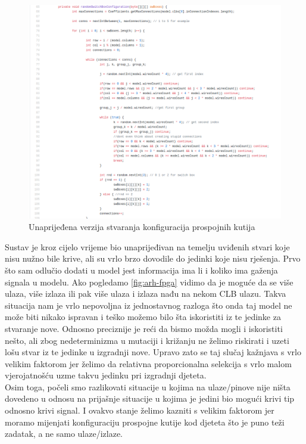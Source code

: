 \documentclass[times, utf8, zavrsni]{fer}
\begin{document}
\begin{figure}[!htb]
	\centering
	\includegraphics[width=18cm]{slike/noviRandomizer.png}
	\caption{Unaprijeđena verzija stvaranja konfiguracija prospojnih kutija}
	\label{fig:novi-random}
\end{figure} 



Sustav je kroz cijelo vrijeme bio unaprijeđivan na temelju uviđenih stvari koje nisu nužno bile krive, ali su vrlo brzo dovodile do jedinki koje nisu rješenja. Prvo što sam odlučio dodati u model jest informacija ima li i koliko ima gaženja signala u modelu. Ako pogledamo \ref{fig:arh-fpga} vidimo da je moguće da se više ulaza, više izlaza ili pak više ulaza i izlaza nađu na nekom CLB ulazu. Takva situacija nam je vrlo nepovoljna iz jednostavnog razloga što onda taj model ne može biti nikako ispravan i teško možemo bilo šta iskoristiti iz te jedinke za stvaranje nove. Odnosno preciznije je reći da bismo možda mogli i iskoristiti nešto, ali zbog nedeterminizma u mutaciji i križanju ne želimo riskirati i uzeti lošu stvar iz te jedinke u izgradnji nove. Upravo zato se taj slučaj kažnjava s vrlo velikim faktorom jer želimo da relativna proporcionalna selekcija s vrlo malom vjerojatnošću uzme takvu jedinku pri izgradnji djeteta. \\ 
Osim toga, počeli smo razlikovati situacije u kojima na ulaze/pinove nije ništa dovedeno u odnosu na prijašnje situacije u kojima je jedini bio mogući krivi tip odnosno krivi signal. I ovakvo stanje želimo kazniti s velikim faktorom jer moramo mijenjati konfiguraciju prospojne kutije kod djeteta što je puno teži zadatak, a ne samo ulaze/izlaze. 
\end{document}
